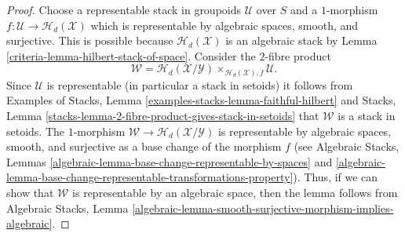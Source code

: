 \begin{proof}

Choose a representable stack in groupoids $\mathcal{U}$ over $S$ and a
$1$-morphism $f : \mathcal{U} \to \mathcal{H}_d(\mathcal{X})$
which is representable by algebraic spaces, smooth, and surjective.
This is possible because $\mathcal{H}_d(\mathcal{X})$ is an algebraic stack by
Lemma \ref{criteria-lemma-hilbert-stack-of-space}.
Consider the $2$-fibre product
$$
\mathcal{W} =
\mathcal{H}_d(\mathcal{X}/\mathcal{Y})
\times_{\mathcal{H}_d(\mathcal{X}), f}
\mathcal{U}.
$$
Since $\mathcal{U}$ is representable (in particular a stack in setoids)
it follows from
Examples of Stacks, Lemma \ref{examples-stacks-lemma-faithful-hilbert}
and
Stacks, Lemma \ref{stacks-lemma-2-fibre-product-gives-stack-in-setoids}
that $\mathcal{W}$ is a stack in setoids. The $1$-morphism
$\mathcal{W} \to \mathcal{H}_d(\mathcal{X}/\mathcal{Y})$ is
representable by algebraic spaces, smooth, and surjective as a base
change of the morphism $f$ (see
Algebraic Stacks,
Lemmas \ref{algebraic-lemma-base-change-representable-by-spaces} and
\ref{algebraic-lemma-base-change-representable-transformations-property}).
Thus, if we can show that $\mathcal{W}$ is representable by an algebraic space,
then the lemma follows from
Algebraic Stacks,
Lemma \ref{algebraic-lemma-smooth-surjective-morphism-implies-algebraic}.


\end{proof}
